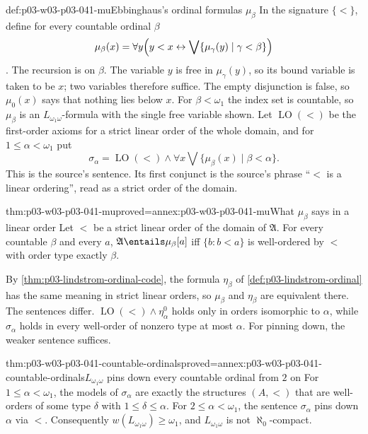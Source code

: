 \begin{hbdefinition}{def:p03-w03-p03-041-mu}{Ebbinghaus's ordinal formulas \(\mu_\beta\)}
In the signature \(\{<\}\), define for every countable ordinal \(\beta\)
\[
 \mu_\beta(x)=\forall y\Bigl(y<x\leftrightarrow
       \bigvee\{\mu_\gamma(y)\mid\gamma<\beta\}\Bigr)
\]
\cite[Ch.~II, Example~5.2.3(c), p.~62]{Ebbinghaus1985ExtendedLogics}.
The recursion is on \(\beta\). The variable \(y\) is free in
\(\mu_\gamma(y)\), so its bound variable is taken to be \(x\); two
variables therefore suffice. The empty disjunction is false, so
\(\mu_0(x)\) says that nothing lies below \(x\). For \(\beta<\omega_1\)
the index set is countable, so \(\mu_\beta\) is an
\(L_{\omega_1\omega}\)-formula with the single free variable shown. Let
\(\operatorname{LO}(<)\) be the first-order axioms for a strict linear
order of the whole domain, and for \(1\leq\alpha<\omega_1\) put
\[
 \sigma_\alpha=\operatorname{LO}(<)\land\forall x\bigvee\{\mu_\beta(x)\mid\beta<\alpha\}.
\]
This is the source's sentence. Its first conjunct is the source's phrase
``\(<\) is a linear ordering'', read as a strict order of the domain.
\end{hbdefinition}

\begin{hblemma}{thm:p03-w03-p03-041-mu}{proved=annex:p03-w03-p03-041-mu}{What \(\mu_\beta\) says in a linear order}
Let \(<\) be a strict linear order of the domain of \(\mathfrak A\). For
every countable \(\beta\) and every \(a\),
\(\mathfrak A\entails\mu_\beta[a]\) iff
\(\{b:b<a\}\) is well-ordered by \(<\) with order type exactly \(\beta\).
\end{hblemma}

By \cref{thm:p03-lindstrom-ordinal-code}, the formula \(\eta_\beta\) of
\cref{def:p03-lindstrom-ordinal} has the same meaning in strict linear
orders, so \(\mu_\beta\) and \(\eta_\beta\) are equivalent there. The
sentences differ. \(\operatorname{LO}(<)\land\eta^0_\alpha\) holds only in
orders isomorphic to \(\alpha\), while \(\sigma_\alpha\) holds in every
well-order of nonzero type at most \(\alpha\). For pinning down, the
weaker sentence suffices.

\begin{hbtheorem}{thm:p03-w03-p03-041-countable-ordinals}{proved=annex:p03-w03-p03-041-countable-ordinals}{\(L_{\omega_1\omega}\) pins down every countable ordinal from \(2\) on}
For \(1\leq\alpha<\omega_1\), the models of \(\sigma_\alpha\) are exactly
the structures \((A,<)\) that are well-orders of some type \(\delta\) with
\(1\leq\delta\leq\alpha\). For \(2\leq\alpha<\omega_1\), the sentence
\(\sigma_\alpha\) pins down \(\alpha\) via \(<\). Consequently
\(w(L_{\omega_1\omega})\geq\omega_1\), and \(L_{\omega_1\omega}\) is not
\(\aleph_0\)-compact.
\end{hbtheorem}

